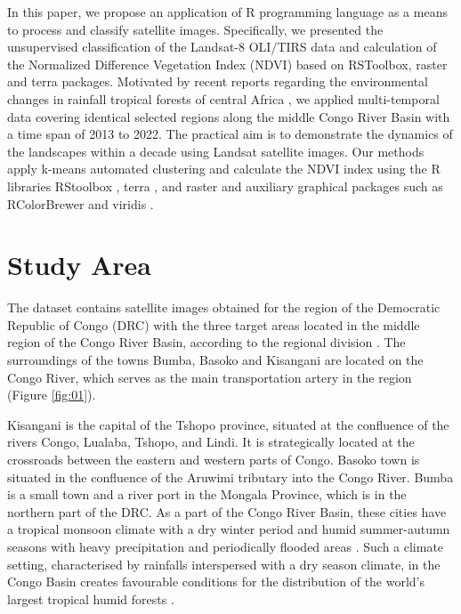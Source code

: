 \documentclass[applsci,article,accept,pdftex,moreauthors]{Definitions/mdpi}
\begin{document}
In this paper, we propose an application of R programming language \cite{RCoreTeam} as a means to process and classify satellite images. Specifically, we presented the unsupervised classification of the Landsat-8 OLI/TIRS data and calculation of the Normalized Difference Vegetation Index (NDVI) based on RSToolbox, raster and terra packages. Motivated by recent reports regarding the environmental changes in rainfall tropical forests of central Africa \cite{Wasseige,lescuyer2010chainsaw,Jayathilake,POTAPOV2012106,Shapiro,7326202}, we applied multi-temporal data covering identical selected regions along the middle Congo River Basin with a time span of 2013 to 2022. The practical aim is to demonstrate the dynamics of the landscapes within a decade using Landsat satellite images. Our methods apply k-means automated clustering and calculate the NDVI index using the R libraries RStoolbox \cite{RStoolbox}, terra \cite{RTerra}, and raster \cite{Hijmans} and auxiliary graphical packages such as RColorBrewer \cite{Neuwirth} and viridis \cite{viridis}. 

\section{Study Area}

The dataset contains satellite images obtained for the region of the Democratic Republic of Congo (DRC) with the three target areas located in the middle region of the Congo River Basin, according to the regional division \cite{MUSHI201964}. The surroundings of the towns Bumba, Basoko and Kisangani are located on the Congo River, which serves as the main transportation artery in the region (Figure \ref{fig:01}). 

Kisangani is the capital of the Tshopo province, situated at the confluence of the rivers Congo, Lualaba, Tshopo, and Lindi. It is strategically located at the crossroads between the eastern and western parts of Congo. Basoko town is situated in the confluence of the Aruwimi tributary into the Congo River. Bumba is a small town and a river port in the Mongala Province, which is in the northern part of the DRC. As a part of the Congo River Basin, these cities have a tropical monsoon climate with a dry winter period and humid summer-autumn seasons with heavy precipitation and periodically flooded areas \cite{6571272}. Such a climate setting, characterised by rainfalls interspersed with a dry season climate, in the Congo Basin creates favourable conditions for the distribution of the world's largest tropical humid forests \cite{Washington}. 
\end{document}
